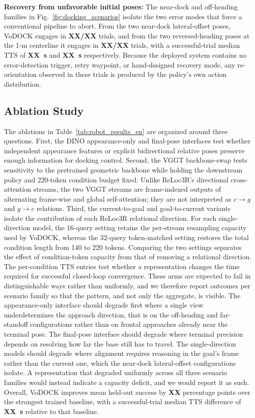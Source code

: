 \documentclass[letterpaper, 10 pt, conference]{IEEEtran}  %
\begin{document}
\textbf{Recovery from unfavorable initial poses:}
The near-dock and off-heading families in Fig.~\ref{fig:docking_scenarios} isolate the two error modes that force a conventional pipeline to abort. From the two near-dock lateral-offset poses, VoDOCK engages in \textbf{XX/XX} trials, and from the two reversed-heading poses at the 1-m centerline it engages in \textbf{XX/XX} trials, with a successful-trial median TTS of \textbf{XX~s} and \textbf{XX~s} respectively. Because the deployed system contains no error-detection trigger, retry waypoint, or hand-designed recovery mode, any re-orientation observed in these trials is produced by the policy's own action distribution.

\subsection{Ablation Study}
\label{subsec:ablation_analysis}

The ablations in Table~\ref{tab:robot_results_en} are organized around three questions. First, the DINO appearance-only and final-pose interfaces test whether independent appearance features or explicit bidirectional relative poses preserve enough information for docking control. Second, the VGGT backbone-swap tests sensitivity to the pretrained geometric backbone while holding the downstream policy and 220-token condition budget fixed. Unlike ReLoc3R's directional cross-attention streams, the two VGGT streams are frame-indexed outputs of alternating frame-wise and global self-attention; they are not interpreted as $c\rightarrow g$ and $g\rightarrow c$ relations. Third, the current-to-goal and goal-to-current variants isolate the contribution of each ReLoc3R relational direction. For each single-direction model, the 16-query setting retains the per-stream resampling capacity used by VoDOCK, whereas the 32-query token-matched setting restores the total condition length from 140 to 220 tokens. Comparing the two settings separates the effect of condition-token capacity from that of removing a relational direction. The per-condition TTS entries test whether a representation changes the time required for successful closed-loop convergence. These arms are expected to fail in distinguishable ways rather than uniformly, and we therefore report outcomes per scenario family so that the pattern, and not only the aggregate, is visible. The appearance-only interface should degrade first where a single view underdetermines the approach direction, that is on the off-heading and far-standoff configurations rather than on frontal approaches already near the terminal pose. The final-pose interface should degrade where terminal precision depends on resolving how far the base still has to travel. The single-direction models should degrade where alignment requires reasoning in the goal's frame rather than the current one, which the near-dock lateral-offset configurations isolate. A representation that degraded uniformly across all three scenario families would instead indicate a capacity deficit, and we would report it as such. Overall, VoDOCK improves mean held-out success by \textbf{XX} percentage points over the strongest trained baseline, with a successful-trial median TTS difference of \textbf{XX~s} relative to that baseline.
\end{document}

